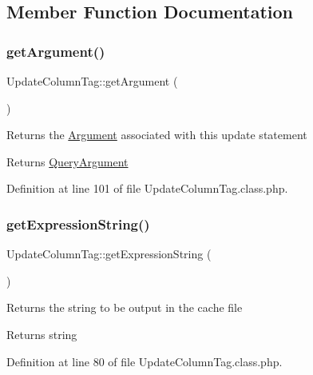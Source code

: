 \subsection{Member Function Documentation}
\hypertarget{classUpdateColumnTag_a6b6cca5c598d435f3f40caf96f5dea4a}{}\label{classUpdateColumnTag_a6b6cca5c598d435f3f40caf96f5dea4a} 
\subsubsection{\texorpdfstring{get\+Argument()}{getArgument()}}
{\footnotesize\ttfamily Update\+Column\+Tag\+::get\+Argument (\begin{DoxyParamCaption}{ }\end{DoxyParamCaption})}

Returns the \hyperlink{classArgument}{Argument} associated with this update statement

\begin{DoxyReturn}{Returns}
\hyperlink{classQueryArgument}{Query\+Argument} 
\end{DoxyReturn}


Definition at line 101 of file Update\+Column\+Tag.\+class.\+php.

\hypertarget{classUpdateColumnTag_a16ab982f05143f8e0c4550f02ebe2357}{}\label{classUpdateColumnTag_a16ab982f05143f8e0c4550f02ebe2357} 
\subsubsection{\texorpdfstring{get\+Expression\+String()}{getExpressionString()}}
{\footnotesize\ttfamily Update\+Column\+Tag\+::get\+Expression\+String (\begin{DoxyParamCaption}{ }\end{DoxyParamCaption})}

Returns the string to be output in the cache file

\begin{DoxyReturn}{Returns}
string 
\end{DoxyReturn}


Definition at line 80 of file Update\+Column\+Tag.\+class.\+php.

\hypertarget{classUpdateColumnTag_a08118f413b38890ca779e44974447854}{}\label{classUpdateColumnTag_a08118f413b38890ca779e44974447854} 
